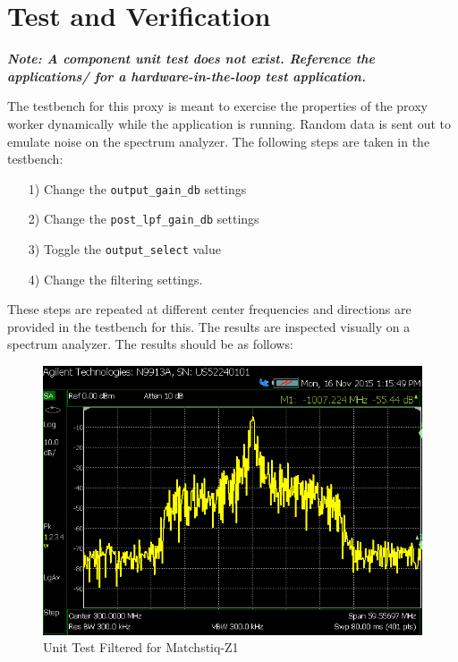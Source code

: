 \documentclass{article}
\begin{document}
\section*{Test and Verification}
\begin{flushleft}

\textit{\textbf{Note: A component unit test does not exist.  Reference the applications/ for a hardware-in-the-loop test application.}}\\ \medskip

	The testbench for this proxy is meant to exercise the properties of the proxy worker dynamically while the application is running.  Random data is sent out to emulate noise on the spectrum analyzer. The following steps are taken in the testbench:
	\begin{itemize}
		\item[1)] Change the \verb+output_gain_db+ settings
		\item[2)] Change the \verb+post_lpf_gain_db+ settings
		\item[3)] Toggle the \verb+output_select+ value
		\item[4)] Change the filtering settings.
	\end{itemize}
	These steps are repeated at different center frequencies and directions are provided in the testbench for this.  The results are inspected visually on a spectrum analyzer.  The results should be as follows:   \\
	\begin{figure}[ht]
		\centerline{\includegraphics[scale=0.7]{NoFilter}}
		\caption{Unit Test Filtered for Matchstiq-Z1}
		\label{fig:nofilt}
	\end{figure}
	\newpage


\end{flushleft}
\end{document}
